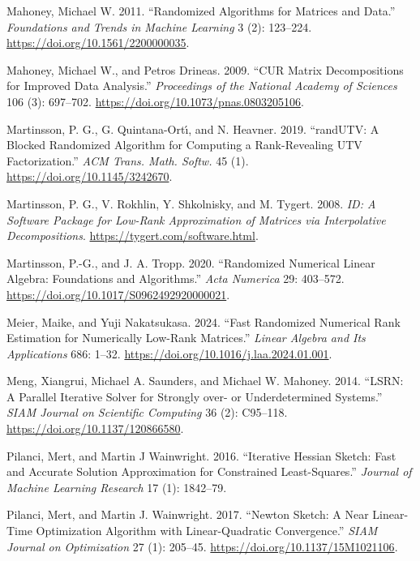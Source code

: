 \documentclass[
  12pt,
]{article}
\newlength{\cslhangindent}
\newenvironment{CSLReferences}[2] %
 {\begin{list}{}{%
  \setlength{\itemindent}{0pt}
  \setlength{\leftmargin}{0pt}
  \setlength{\parsep}{0pt}
  \ifodd #1
   \setlength{\leftmargin}{\cslhangindent}
   \setlength{\itemindent}{-1\cslhangindent}
  \fi
  \setlength{\itemsep}{#2\baselineskip}}}
 {\end{list}}
\begin{document}
\begin{CSLReferences}{1}{1}
Mahoney, Michael W. 2011. {``Randomized Algorithms for Matrices and
Data.''} \emph{Foundations and Trends in Machine Learning} 3 (2):
123--224. \url{https://doi.org/10.1561/2200000035}.

Mahoney, Michael W., and Petros Drineas. 2009. {``CUR Matrix
Decompositions for Improved Data Analysis.''} \emph{Proceedings of the
National Academy of Sciences} 106 (3): 697--702.
\url{https://doi.org/10.1073/pnas.0803205106}.

Martinsson, P. G., G. Quintana-Ortı́, and N. Heavner. 2019. {``randUTV: A
Blocked Randomized Algorithm for Computing a Rank-Revealing UTV
Factorization.''} \emph{ACM Trans. Math. Softw.} 45 (1).
\url{https://doi.org/10.1145/3242670}.

Martinsson, P. G., V. Rokhlin, Y. Shkolnisky, and M. Tygert. 2008.
\emph{{ID}: A Software Package for Low-Rank Approximation of Matrices
via Interpolative Decompositions}.
\url{https://tygert.com/software.html}.

Martinsson, P.-G., and J. A. Tropp. 2020. {``Randomized Numerical Linear
Algebra: Foundations and Algorithms.''} \emph{Acta Numerica} 29:
403--572. \url{https://doi.org/10.1017/S0962492920000021}.

Meier, Maike, and Yuji Nakatsukasa. 2024. {``Fast Randomized Numerical
Rank Estimation for Numerically Low-Rank Matrices.''} \emph{Linear
Algebra and Its Applications} 686: 1--32.
\url{https://doi.org/10.1016/j.laa.2024.01.001}.

Meng, Xiangrui, Michael A. Saunders, and Michael W. Mahoney. 2014.
{``LSRN: A Parallel Iterative Solver for Strongly over- or
Underdetermined Systems.''} \emph{SIAM Journal on Scientific Computing}
36 (2): C95--118. \url{https://doi.org/10.1137/120866580}.

Pilanci, Mert, and Martin J Wainwright. 2016. {``Iterative Hessian
Sketch: Fast and Accurate Solution Approximation for Constrained
Least-Squares.''} \emph{Journal of Machine Learning Research} 17 (1):
1842--79.

Pilanci, Mert, and Martin J. Wainwright. 2017. {``Newton Sketch: A Near
Linear-Time Optimization Algorithm with Linear-Quadratic Convergence.''}
\emph{SIAM Journal on Optimization} 27 (1): 205--45.
\url{https://doi.org/10.1137/15M1021106}.


\end{CSLReferences}
\end{document}
